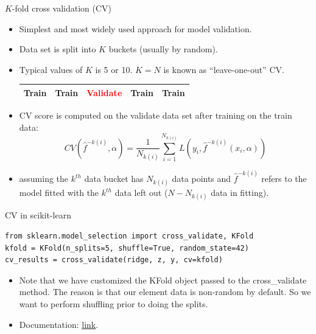 \documentclass[aspectratio=169]{beamer}
\begin{document}
\begin{frame}{$K$-fold cross validation (CV)}
    \begin{itemize}
        \item Simplest and most widely used approach for model validation.
        \item Data set is split into $K$ buckets (usually by random).
        \item Typical values of $K$ is 5 or 10. $K = N$ is known as ``leave-one-out'' CV.
        \begin{table}
        \begin{tabular}{|p{1.7cm}|p{1.7cm}|p{1.7cm}|p{1.7cm}|p{1.7cm}|}
            \hline
            \Large{Train} & \Large{Train} & \textcolor{red}{\Large{Validate}} & \Large{Train} & \Large{Train}\\
            \hline
        \end{tabular}
        \end{table}
        \item CV score is computed on the validate data set after training on the train data:
        \begin{equation*}
                CV(\hat{f}^{-k(i)},\alpha) = \frac{1}{N_{k(i)}}\sum_{i=1}^{N_{k(i)}} L(y_i, \hat{f}^{-k(i)}(x_i,\alpha))
        \end{equation*}
        \item assuming the $k^{th}$ data bucket has $N_{k(i)}$ data points and $\hat{f}^{-k(i)}$ refers to the model fitted with the $k^{th}$ data left out ($N-N_{k(i)}$ data in fitting).
    \end{itemize}
\end{frame}


\begin{frame}[fragile]{CV in scikit-learn}
\begin{verbatim}
from sklearn.model_selection import cross_validate, KFold
kfold = KFold(n_splits=5, shuffle=True, random_state=42)
cv_results = cross_validate(ridge, z, y, cv=kfold)
\end{verbatim}
\begin{itemize}
    \item Note that we have customized the KFold object passed to the cross\_validate method. The reason is that our element data is non-random by default. So we want to perform shuffling prior to doing the splits.
    \item Documentation: \href{https://scikit-learn.org/stable/modules/generated/sklearn.model_selection.cross_validate.html?highlight=cross_validate#sklearn.model_selection.cross_validate}{link}.
\end{itemize}
\end{frame}
\end{document}
